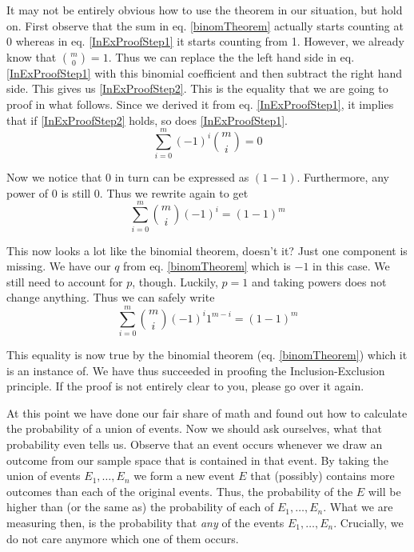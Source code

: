 \documentclass[a4paper,11pt,leqno]{report}
\begin{document}
It may not be entirely obvious how to use the theorem in our situation, but hold on. First observe
that the sum in eq. \ref{binomTheorem} actually starts counting at 0 whereas in eq. \ref{InExProofStep1}
it starts counting from 1. However, we already know that $ \binom{m}{0} = 1 $. Thus we can replace the
the left hand side in eq. \ref{InExProofStep1} with this binomial coefficient and then subtract the
right hand side. This gives us \ref{InExProofStep2}. This is the equality that we are going to proof
in what follows. Since we derived it from eq. \ref{InExProofStep1}, it implies that if \ref{InExProofStep2}
holds, so does \ref{InExProofStep1}.
\begin{equation} \label{InExProofStep2}
\underset{i=0}{\overset{m}{\sum}}(-1)^{i}\binom{m}{i} = 0
\end{equation} 

Now we notice that $ 0 $ in turn can be expressed as $ (1-1) $. Furthermore, any power of 0 is still 0.
Thus we rewrite again to get
\begin{equation}
\underset{i=0}{\overset{m}{\sum}}\binom{m}{i}(-1)^{i} = (1-1)^{m}
\end{equation}

This now looks a lot like the binomial theorem, doesn't it? Just one component is missing. We have
our $ q $ from eq. \ref{binomTheorem} which is $ -1 $ in this case. We still need to account for 
$ p $, though. Luckily, $ p=1 $ and taking powers does not change anything. Thus we can safely write
\begin{equation}
\underset{i=0}{\overset{m}{\sum}}\binom{m}{i}(-1)^{i}1^{m-i} = (1-1)^{m}
\end{equation} 

This equality is now true by the binomial theorem (eq. \ref{binomTheorem}) which it is an instance of.
We have thus succeeded in proofing the Inclusion-Exclusion principle. If the proof is not entirely
clear to you, please go over it again.

At this point we have done our fair share of math and found out how to calculate the probability of a union
of events. Now we should ask ourselves, what that probability even tells us. Observe that an event 
occurs whenever we draw an outcome from our sample space that is contained in that event. By taking the union
of events $ E_{1}, \ldots, E_{n} $ we form a new event $ E $ that (possibly) contains more outcomes than each 
of the original events. Thus, the probability of the $ E $ will be higher than (or the same as) the 
probability of each of $ E_{1}, \ldots, E_{n} $. What we are measuring then, is the probability that 
\textit{any} of the events $ E_{1}, \ldots, E_{n} $. Crucially, we do not care anymore which one of them
occurs.
\end{document}
